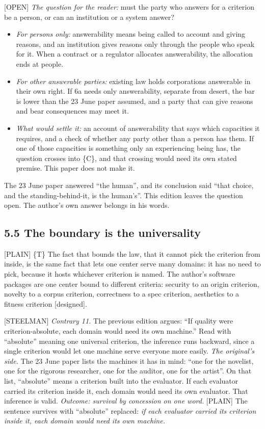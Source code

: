 \documentclass[11pt]{article}
\newcommand{\register}[1]{{\ttfamily\small #1}}
\begin{document}
\register{[OPEN]} \emph{The question for the reader:} must the party who answers for a criterion be a person, or can an institution or a system answer?

\begin{itemize}
\item \emph{For persons only:} answerability means being called to account and giving reasons, and an institution gives reasons only through the people who speak for it. When a contract or a regulator allocates answerability, the allocation ends at people.
\item \emph{For other answerable parties:} existing law holds corporations answerable in their own right. If 6a needs only answerability, separate from desert, the bar is lower than the 23 June paper assumed, and a party that can give reasons and bear consequences may meet it.
\item \emph{What would settle it:} an account of answerability that says which capacities it requires, and a check of whether any party other than a person has them. If one of those capacities is something only an experiencing being has, the question crosses into \{C\}, and that crossing would need its own stated premise. This paper does not make it.
\end{itemize}
The 23 June paper answered ``the human'', and its conclusion said ``that choice, and the standing-behind-it, is the human's''. This edition leaves the question open. The author's own answer belongs in his words.

\subsection*{5.5 The boundary is the universality}

\register{[PLAIN]} \{T\} The fact that bounds the law, that it cannot pick the criterion from inside, is the same fact that lets one center serve many domains: it has no need to pick, because it hosts whichever criterion is named. The author's software packages are one center bound to different criteria: security to an origin criterion, novelty to a corpus criterion, correctness to a spec criterion, aesthetics to a fitness criterion [designed].

\register{[STEELMAN]} \emph{Contrary 11.} The previous edition argues: ``If quality were criterion-absolute, each domain would need its own machine.'' Read with ``absolute'' meaning one universal criterion, the inference runs backward, since a single criterion would let one machine serve everyone more easily. \emph{The original's side.} The 23 June paper lists the machines it has in mind: ``one for the novelist, one for the rigorous researcher, one for the auditor, one for the artist''. On that list, ``absolute'' means a criterion built into the evaluator. If each evaluator carried its criterion inside it, each domain would need its own evaluator. That inference is valid. \emph{Outcome: survival by concession on one word.} \register{[PLAIN]} The sentence survives with ``absolute'' replaced: \emph{if each evaluator carried its criterion inside it, each domain would need its own machine.}
\end{document}
